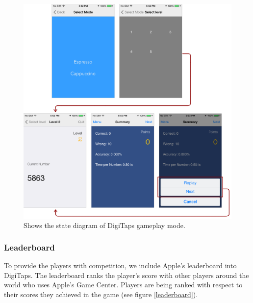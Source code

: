 \begin{figure}[ht!]
  \centering
  \includegraphics[width=1.0\textwidth]{figures/gameplay.png}
  \caption{Shows the state diagram of DigiTaps gameplay mode.}
  \label{gameplay}
\end{figure}
    
\subsubsection{Leaderboard}
    To provide the players with competition, we include Apple's leaderboard into DigiTaps. The leaderboard ranks the player's score with other players around the world who uses Apple's Game Center. Players are being ranked with respect to their scores they achieved in the game (see figure \ref{leaderboard}).
    
